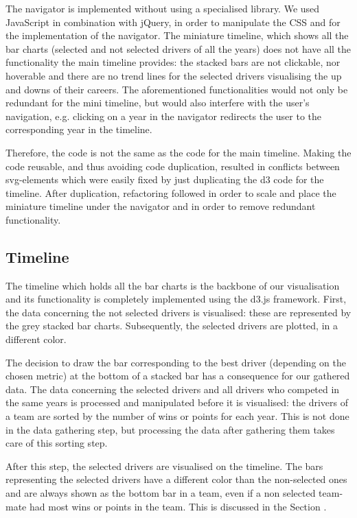 \documentclass{sigchi}
\begin{document}
The navigator is implemented without using a specialised library. We used JavaScript in combination with jQuery, in order to manipulate the CSS and for the implementation of the navigator. The miniature timeline, which shows all the bar charts (selected and not selected drivers of all the years) does not have all the functionality the main timeline provides: the stacked bars are not clickable, nor hoverable and there are no trend lines for the selected drivers visualising the up and downs of their careers. The aforementioned functionalities would not only be redundant for the mini timeline, but would also interfere with the user’s navigation, e.g. clicking on a year in the navigator redirects the user to the corresponding year  in the timeline.

Therefore, the code is not the same as the code for the main timeline. Making the code reusable, and thus avoiding code duplication, resulted in conflicts between svg-elements which were easily fixed by just duplicating the d3 code for the timeline. After duplication, refactoring followed in order to scale and place the miniature timeline under the navigator and in order to remove redundant functionality. 



\subsection{Timeline} 

The timeline which holds all the bar charts is the backbone of our visualisation and its functionality is completely implemented using the d3.js framework. First, the data concerning the not selected drivers is visualised: these are represented by the grey stacked bar charts. Subsequently, the selected drivers are plotted, in a different color. 

The decision to draw the bar corresponding to the best driver (depending on the chosen metric) at the bottom of a stacked bar has a consequence for our gathered data. The data concerning the selected drivers and all drivers who competed in the same years is processed and manipulated before it is visualised: the drivers of a team are sorted by the number of wins or points for each year. This is not done in the data gathering step, but processing the data after gathering them takes care of this sorting step.

After this step, the selected drivers are visualised on the timeline. The bars representing the selected drivers have a different color than the non-selected ones and are always shown as the bottom bar in a team, even if a non selected team-mate had most wins or points in the team. This is discussed in the Section .
\end{document}
